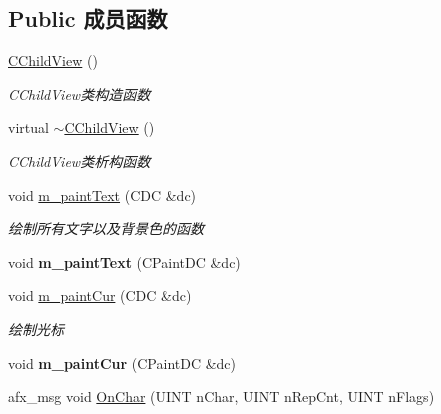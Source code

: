 \subsection*{Public 成员函数}
\begin{DoxyCompactItemize}
\item 
\mbox{\label{class_c_child_view_aff5af7c162c10755edbe58f260ded6d4}} 
\hyperlink{class_c_child_view_aff5af7c162c10755edbe58f260ded6d4}{C\+Child\+View} ()
\begin{DoxyCompactList}\small\item\em C\+Child\+View类构造函数 \end{DoxyCompactList}\item 
\mbox{\label{class_c_child_view_a5b033b5e0a130950719a173b86418698}} 
virtual \hyperlink{class_c_child_view_a5b033b5e0a130950719a173b86418698}{$\sim$\+C\+Child\+View} ()
\begin{DoxyCompactList}\small\item\em C\+Child\+View类析构函数 \end{DoxyCompactList}\item 
void \hyperlink{class_c_child_view_a4764e41ed2ac3f2ce69916b3881894fe}{m\+\_\+paint\+Text} (C\+DC \&dc)
\begin{DoxyCompactList}\small\item\em 绘制所有文字以及背景色的函数 ~\newline
\end{DoxyCompactList}\item 
\mbox{\label{class_c_child_view_a5acb3356732e7ea39a4468855f90fc85}} 
void {\bfseries m\+\_\+paint\+Text} (C\+Paint\+DC \&dc)
\item 
void \hyperlink{class_c_child_view_a434383ba85ab567141366ecddeb2c9d6}{m\+\_\+paint\+Cur} (C\+DC \&dc)
\begin{DoxyCompactList}\small\item\em 绘制光标 ~\newline
\end{DoxyCompactList}\item 
\mbox{\label{class_c_child_view_a40222a570c569017c93dd3fc088aa893}} 
void {\bfseries m\+\_\+paint\+Cur} (C\+Paint\+DC \&dc)
\item 
afx\+\_\+msg void \hyperlink{class_c_child_view_af29ede94259b52b2ad54d139ff554abe}{On\+Char} (U\+I\+NT n\+Char, U\+I\+NT n\+Rep\+Cnt, U\+I\+NT n\+Flags)

\end{DoxyCompactItemize}
